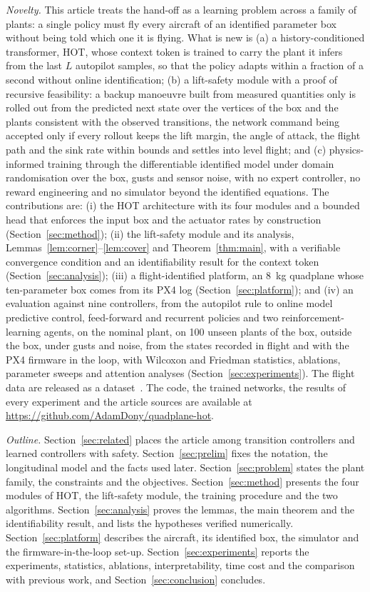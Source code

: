 \documentclass[final,5p,times,twocolumn]{elsarticle}
\newcommand{\numCross}{100}
\begin{document}
\emph{Novelty.} This article treats the hand-off as a learning problem across a family of plants: a single policy must fly every aircraft of an identified parameter box without being told which one it is flying. What is new is (a) a history-conditioned transformer, HOT, whose context token is trained to carry the plant it infers from the last $L$ autopilot samples, so that the policy adapts within a fraction of a second without online identification; (b) a lift-safety module with a proof of recursive feasibility: a backup manoeuvre built from measured quantities only is rolled out from the predicted next state over the vertices of the box and the plants consistent with the observed transitions, the network command being accepted only if every rollout keeps the lift margin, the angle of attack, the flight path and the sink rate within bounds and settles into level flight; and (c) physics-informed training through the differentiable identified model under domain randomisation over the box, gusts and sensor noise, with no expert controller, no reward engineering and no simulator beyond the identified equations. The contributions are: (i) the HOT architecture with its four modules and a bounded head that enforces the input box and the actuator rates by construction (Section~\ref{sec:method}); (ii) the lift-safety module and its analysis, Lemmas~\ref{lem:corner}--\ref{lem:cover} and Theorem~\ref{thm:main}, with a verifiable convergence condition and an identifiability result for the context token (Section~\ref{sec:analysis}); (iii) a flight-identified platform, an \SI{8}{kg} quadplane whose ten-parameter box comes from its PX4 log (Section~\ref{sec:platform}); and (iv) an evaluation against nine controllers, from the autopilot rule to online model predictive control, feed-forward and recurrent policies and two reinforcement-learning agents, on the nominal plant, on \numCross{} unseen plants of the box, outside the box, under gusts and noise, from the states recorded in flight and with the PX4 firmware in the loop, with Wilcoxon and Friedman statistics, ablations, parameter sweeps and attention analyses (Section~\ref{sec:experiments}). The flight data are released as a dataset~\cite{Dony2026data}. The code, the trained networks, the results of every experiment and the article sources are available at \url{https://github.com/AdamDony/quadplane-hot}.

\emph{Outline.} Section~\ref{sec:related} places the article among transition controllers and learned controllers with safety. Section~\ref{sec:prelim} fixes the notation, the longitudinal model and the facts used later. Section~\ref{sec:problem} states the plant family, the constraints and the objectives. Section~\ref{sec:method} presents the four modules of HOT, the lift-safety module, the training procedure and the two algorithms. Section~\ref{sec:analysis} proves the lemmas, the main theorem and the identifiability result, and lists the hypotheses verified numerically. Section~\ref{sec:platform} describes the aircraft, its identified box, the simulator and the firmware-in-the-loop set-up. Section~\ref{sec:experiments} reports the experiments, statistics, ablations, interpretability, time cost and the comparison with previous work, and Section~\ref{sec:conclusion} concludes.
\end{document}
